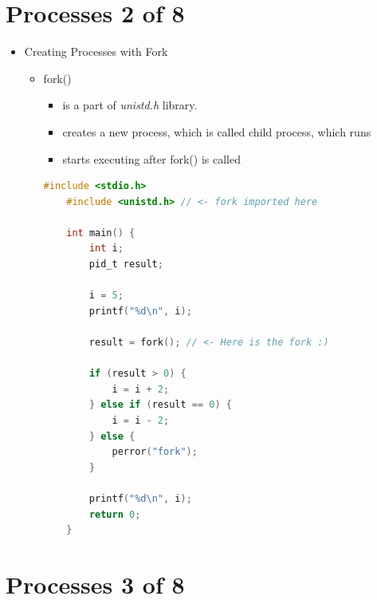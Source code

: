 \documentclass[12pt]{article}
\begin{document}
\bigskip

\section*{Processes 2 of 8}

\bigskip

\begin{itemize}
    \item Creating Processes with Fork
    \begin{itemize}
        \item fork()
        \begin{itemize}
            \item is a part of \textit{unistd.h} library.
            \item creates a new process, which is called child process, which runs
            \item starts executing after fork() is called
        \end{itemize}

        \bigskip

    \begin{lstlisting}[language=c,caption={process\_example\_1.c}]
    #include <stdio.h>
    #include <unistd.h> // <- fork imported here

    int main() {
        int i;
        pid_t result;

        i = 5;
        printf("%d\n", i);

        result = fork(); // <- Here is the fork :)

        if (result > 0) {
            i = i + 2;
        } else if (result == 0) {
            i = i - 2;
        } else {
            perror("fork");
        }

        printf("%d\n", i);
        return 0;
    }
    \end{lstlisting}

    \end{itemize}
\end{itemize}

\bigskip

\section*{Processes 3 of 8}

\bigskip
\end{document}
